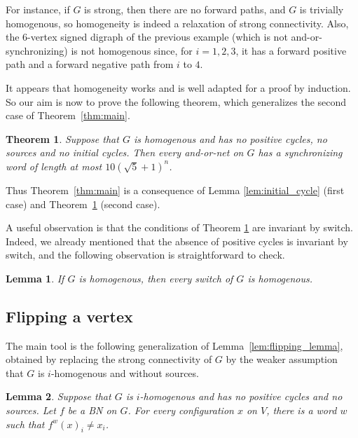 \documentclass[11pt,letter]{article}
\newtheorem{lemma}{Lemma}
\newtheorem{theorem}{Theorem}
\begin{document}
\medskip
For instance, if $G$ is strong, then there are no forward paths, and $G$ is trivially homogenous, so homogeneity is indeed a relaxation of strong connectivity. Also, the $6$-vertex signed digraph of the previous example (which is not and-or-synchronizing) is not homogenous since, for $i=1,2,3$, it has a forward positive path and a forward negative path from $i$ to $4$. 

\medskip
It appears that homogeneity works and is well adapted for a proof by induction. So our aim is now to prove the following theorem, which generalizes the second case of Theorem~\ref{thm:main}. 

\begin{theorem}\label{thm:main2}
Suppose that $G$ is homogenous and has no positive cycles, no sources and no initial cycles. Then every and-or-net on $G$ has a synchronizing word of length at most $10(\sqrt{5}+1)^n$.
\end{theorem}

Thus Theorem~\ref{thm:main} is a consequence of Lemma \ref{lem:initial_cycle} (first case) and  Theorem~\ref{thm:main2} (second case).

\medskip
A useful observation is that the conditions of Theorem \ref{thm:main2} are invariant by switch. Indeed, we already mentioned that the absence of positive cycles is invariant by switch, and the following observation is straightforward to check. 

\begin{lemma}\label{lem:invariant_homogeneity}
If $G$ is homogenous, then every switch of $G$ is homogenous.
\end{lemma}

\subsection{Flipping a vertex}

The main tool is the following generalization of Lemma~\ref{lem:flipping_lemma}, obtained by replacing the strong connectivity of $G$ by the weaker assumption that $G$ is $i$-homogenous and without sources. 

\begin{lemma}\label{lem:no_fixed_vertex}
Suppose that $G$ is $i$-homogenous and has no positive cycles and no sources. Let $f$ be a BN on $G$. For every configuration $x$ on $V$, there is a word $w$ such that $f^w(x)_i\neq x_i$.
\end{lemma}
\end{document}
